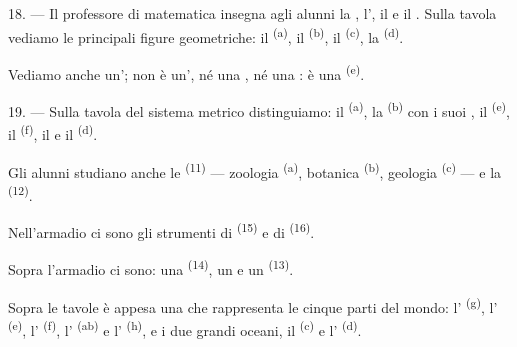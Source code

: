 \VUsaut{5.0mm}
\VUsaut{3.6mm}

18. --- Il professore di matematica insegna agli alunni la ,
l', il  e il . Sulla
tavola vediamo le principali figure geometriche: il 
\textsuperscript{(a)}, il  \textsuperscript{(b)}, il
 \textsuperscript{(c)}, la  \textsuperscript{(d)}.

Vediamo anche un'; non è un', né una
, né una : è una 
\textsuperscript{(e)}.

19. --- Sulla tavola del sistema metrico distinguiamo: il 
\textsuperscript{(a)}, la  \textsuperscript{(b)} con i suoi
, il  \textsuperscript{(e)}, il 
\textsuperscript{(f)}, il  e il 
\textsuperscript{(d)}.

Gli alunni studiano anche le  \textsuperscript{(11)} ---
zoologia \textsuperscript{(a)}, botanica \textsuperscript{(b)}, geologia
\textsuperscript{(c)} --- e la  \textsuperscript{(12)}.

Nell'armadio ci sono gli strumenti di  \textsuperscript{(15)} e di
 \textsuperscript{(16)}.

Sopra l'armadio ci sono: una  \textsuperscript{(14)}, un  e
un  \textsuperscript{(13)}.

Sopra le tavole è appesa una  che rappresenta le cinque parti del
mondo: l' \textsuperscript{(g)}, l'
\textsuperscript{(e)}, l' \textsuperscript{(f)}, l'
\textsuperscript{(ab)} e l' \textsuperscript{(h)}, e i due grandi
oceani, il  \textsuperscript{(c)} e l'
\textsuperscript{(d)}.
\VUsaut{6.0mm}
\VUfilet{22mm}

